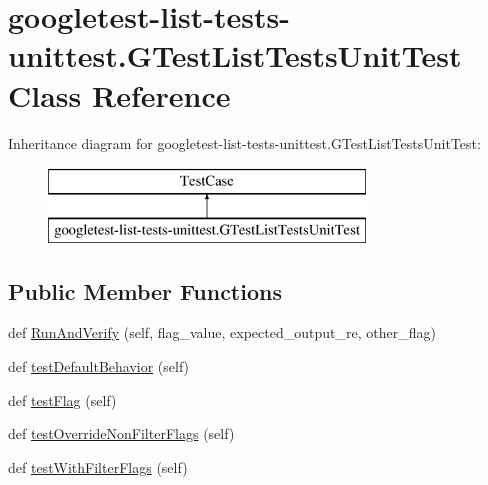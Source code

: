 \hypertarget{classgoogletest-list-tests-unittest_1_1_g_test_list_tests_unit_test}{}\section{googletest-\/list-\/tests-\/unittest.G\+Test\+List\+Tests\+Unit\+Test Class Reference}
\label{classgoogletest-list-tests-unittest_1_1_g_test_list_tests_unit_test}
Inheritance diagram for googletest-\/list-\/tests-\/unittest.G\+Test\+List\+Tests\+Unit\+Test\+:\begin{figure}[H]
\begin{center}
\leavevmode
\includegraphics[height=2.000000cm]{classgoogletest-list-tests-unittest_1_1_g_test_list_tests_unit_test}
\end{center}
\end{figure}
\subsection*{Public Member Functions}
\begin{DoxyCompactItemize}
\item 
def \mbox{\hyperlink{classgoogletest-list-tests-unittest_1_1_g_test_list_tests_unit_test_a6630e10404717e8edd3df1439fb0d81c}{Run\+And\+Verify}} (self, flag\+\_\+value, expected\+\_\+output\+\_\+re, other\+\_\+flag)
\item 
def \mbox{\hyperlink{classgoogletest-list-tests-unittest_1_1_g_test_list_tests_unit_test_aacba8c9eaef1b649ba40ede17218d0f1}{test\+Default\+Behavior}} (self)
\item 
def \mbox{\hyperlink{classgoogletest-list-tests-unittest_1_1_g_test_list_tests_unit_test_a8f5b423963d862456348a8903ccdfade}{test\+Flag}} (self)
\item 
def \mbox{\hyperlink{classgoogletest-list-tests-unittest_1_1_g_test_list_tests_unit_test_a961396c3c2b8d22f6491beb5348594aa}{test\+Override\+Non\+Filter\+Flags}} (self)
\item 
def \mbox{\hyperlink{classgoogletest-list-tests-unittest_1_1_g_test_list_tests_unit_test_adb60d2295fee8ed4af2a5ee1a32e5778}{test\+With\+Filter\+Flags}} (self)
\end{DoxyCompactItemize}


